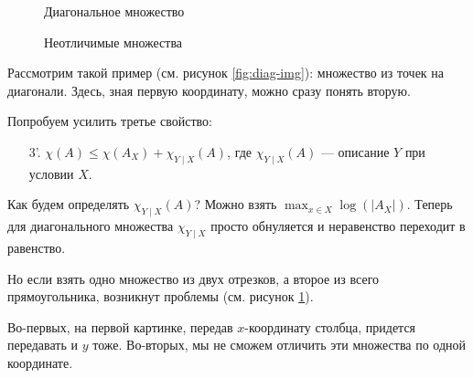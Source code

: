 \begin{figure}[h]
\begin{minipage}{0.5\textwidth}
    \centering
	\caption{Диагональное множество}
    \label{fig:diag-img}
\end{minipage}
\begin{minipage}{0.5\textwidth}
    \centering
	\caption{Неотличимые множества}
    \label{fig:corner-img}
\end{minipage}
\end{figure}
\begin{ex}
	Рассмотрим такой пример (см. рисунок \ref{fig:diag-img}): множество из точек на диагонали.
Здесь, зная первую координату, можно сразу понять вторую.
\end{ex}
Попробуем усилить третье свойство:
\begin{enumerate}
	\item[3'.] $ \chi(A) \le \chi(A_{X}) + \chi_{Y \mid X} (A)$, где $ \chi _{Y \mid X}(A)$ --- описание $ Y$ при условии $ X$.
\end{enumerate} 
Как будем определять $ \chi_{Y \mid X} (A)$?
Можно взять $ \max_{x \in X} \log(\lvert A_X \rvert)$.
Теперь для диагонального множества $ \chi_{Y \mid X}$ просто обнуляется и неравенство переходит в равенство.

\begin{ex}
	Но если взять одно множество из двух отрезков, а второе из всего прямоугольника, возникнут проблемы (см. рисунок \ref{fig:corner-img}). 

Во-первых, на первой картинке, передав $ x$-координату столбца, придется передавать  и $ y$ тоже. Во-вторых, мы не сможем отличить эти множества по одной координате.
\end{ex}


